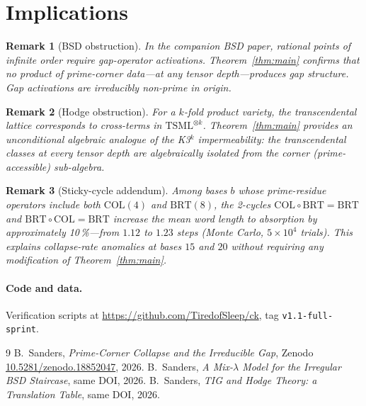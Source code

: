 \documentclass[11pt]{article}
\newtheorem{remark}{Remark}
\begin{document}
\section{Implications}

\begin{remark}[BSD obstruction]
In the companion BSD paper, rational points of infinite order
require gap-operator activations.
Theorem~\ref{thm:main} confirms that no product of prime-corner
data---at any tensor depth---produces gap structure.
Gap activations are irreducibly non-prime in origin.
\end{remark}

\begin{remark}[Hodge obstruction]
For a $k$-fold product variety, the transcendental lattice
corresponds to cross-terms in $\mathrm{TSML}^{\otimes k}$.
Theorem~\ref{thm:main} provides an unconditional algebraic
analogue of the K3$^k$ impermeability: the transcendental
classes at every tensor depth are algebraically isolated
from the corner (prime-accessible) sub-algebra.
\end{remark}

\begin{remark}[Sticky-cycle addendum]
Among bases $b$ whose prime-residue operators include
both $\mathrm{COL}(4)$ and $\mathrm{BRT}(8)$, the
2-cycles $\mathrm{COL}\circ\mathrm{BRT}=\mathrm{BRT}$
and $\mathrm{BRT}\circ\mathrm{COL}=\mathrm{BRT}$
increase the mean word length to absorption by
approximately 10\,\%---from $1.12$ to $1.23$ steps
(Monte Carlo, $5\times10^4$ trials).
This explains collapse-rate anomalies at bases $15$ and $20$
without requiring any modification of
Theorem~\ref{thm:main}.
\end{remark}

\paragraph{Code and data.}
Verification scripts at
\url{https://github.com/TiredofSleep/ck}, tag \texttt{v1.1-full-sprint}.

\begin{thebibliography}{9}
B.~Sanders,
\textit{Prime-Corner Collapse and the Irreducible Gap},
Zenodo \href{https://doi.org/10.5281/zenodo.18852047}{10.5281/zenodo.18852047},
2026.
B.~Sanders,
\textit{A Mix-$\lambda$ Model for the Irregular BSD Staircase},
same DOI, 2026.
B.~Sanders,
\textit{TIG and Hodge Theory: a Translation Table},
same DOI, 2026.
\end{thebibliography}
\end{document}
